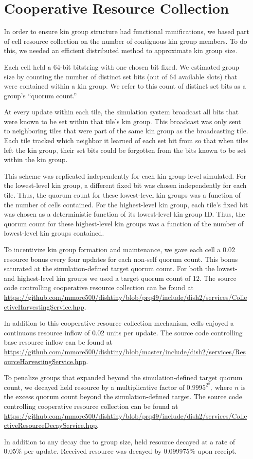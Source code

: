 \section{Cooperative Resource Collection}

In order to ensure kin group structure had functional ramifications, we based part of cell resource collection on the number of contiguous kin group members.
To do this, we needed an efficient distributed method to approximate kin group size.

Each cell held a 64-bit bitstring with one chosen bit fixed.
We estimated group size by counting the number of distinct set bits (out of 64 available slots) that were contained within a kin group.
We refer to this count of distinct set bits as a group's ``quorum count.''

At every update within each tile, the simulation system broadcast all bits that were known to be set within that tile's kin group.
This broadcast was only sent to neighboring tiles that were part of the same kin group as the broadcasting tile.
Each tile tracked which neighbor it learned of each set bit from so that when tiles left the kin group, their set bits could be forgotten from the bits known to be set within the kin group.

This scheme was replicated independently for each kin group level simulated.
For the lowest-level kin group, a different fixed bit was chosen independently for each tile.
Thus, the quorum count for these lowest-level kin groups was a function of the number of cells contained.
For the highest-level kin group, each tile's fixed bit was chosen as a deterministic function of its lowest-level kin group ID.
Thus, the quorum count for these highest-level kin groups was a function of the number of lowest-level kin groups contained.

To incentivize kin group formation and maintenance, we gave each cell a 0.02 resource bonus every four updates for each non-self quorum count.
This bonus saturated at the simulation-defined target quorum count.
For both the lowest- and highest-level kin groups we used a target quorum count of 12.
The source code controlling cooperative resource collection can be found at \url{https://github.com/mmore500/dishtiny/blob/prq49/include/dish2/services/CollectiveHarvestingService.hpp}.

In addition to this cooperative resource collection mechanism, cells enjoyed a continuous resource inflow of 0.02 units per update.
The source code controlling base resource inflow can be found at \url{https://github.com/mmore500/dishtiny/blob/master/include/dish2/services/ResourceHarvestingService.hpp}.

To penalize groups that expanded beyond the simulation-defined target quorum count, we decayed held resource by a multiplicative factor of $0.9995^{2^n}$, where $n$ is the excess quorum count beyond the simulation-defined target.
The source code controlling cooperative resource collection can be found at \url{https://github.com/mmore500/dishtiny/blob/prq49/include/dish2/services/CollectiveResourceDecayService.hpp}.

In addition to any decay due to group size, held resource decayed at a rate of 0.05\% per update.
Received resource was decayed by 0.099975\% upon receipt.
